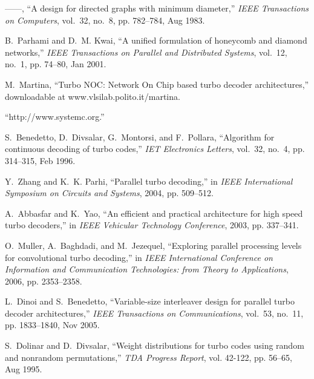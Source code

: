 \documentclass[10pt,twocolumn,journal]{IEEEtran}
\begin{document}
\begin{thebibliography}{10}
------, ``A design for directed graphs with minimum diameter,'' \emph{IEEE
  Transactions on Computers}, vol.~32, no.~8, pp. 782--784, Aug 1983.

B.~Parhami and D.~M. Kwai, ``A unified formulation of honeycomb and diamond
  networks,'' \emph{IEEE Transactions on Parallel and Distributed Systems},
  vol.~12, no.~1, pp. 74--80, Jan 2001.

M.~Martina, ``{T}urbo {NOC}: {N}etwork {O}n {C}hip based turbo decoder
  architectures,'' downloadable at www.vlsilab.polito.it/martina.

``http://www.systemc.org.''

S.~Benedetto, D.~Divsalar, G.~Montorsi, and F.~Pollara, ``Algorithm for
  continuous decoding of turbo codes,'' \emph{IET Electronics Letters},
  vol.~32, no.~4, pp. 314--315, Feb 1996.

Y.~Zhang and K.~K. Parhi, ``Parallel turbo decoding,'' in \emph{IEEE
  International Symposium on Circuits and Systems}, 2004, pp. 509--512.

A.~Abbasfar and K.~Yao, ``An efficient and practical architecture for high
  speed turbo decoders,'' in \emph{IEEE Vehicular Technology Conference}, 2003,
  pp. 337--341.

O.~Muller, A.~Baghdadi, and M.~Jezequel, ``Exploring parallel processing levels
  for convolutional turbo decoding,'' in \emph{IEEE International Conference on
  Information and Communication Technologies: from Theory to Applications},
  2006, pp. 2353--2358.

L.~Dinoi and S.~Benedetto, ``Variable-size interleaver design for parallel
  turbo decoder architectures,'' \emph{IEEE Transactions on Communications},
  vol.~53, no.~11, pp. 1833--1840, Nov 2005.

S.~Dolinar and D.~Divsalar, ``Weight distributions for turbo codes using random
  and nonrandom permutations,'' \emph{TDA Progress Report}, vol. 42-122, pp.
  56--65, Aug 1995.

\end{thebibliography}
\end{document}
